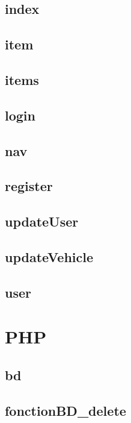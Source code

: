 \documentclass[a4paper,12pt]{report}
\begin{document}
\subsection{index}

\subsection{item}

\subsection{items}

\subsection{login}

\subsection{nav}

\subsection{register}

\subsection{updateUser}

\subsection{updateVehicle}

\subsection{user}


\section{PHP}

\subsection{bd}

\subsection{fonctionBD\_delete}

\end{document}
